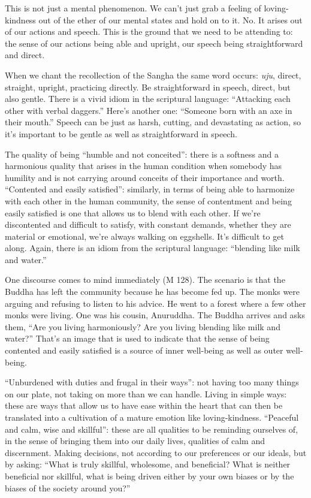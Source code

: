 This is not just a mental phenomenon. We can’t just grab a feeling of
loving-kindness out of the ether of our mental states and hold on to it.
No. It arises out of our actions and speech. This is the ground that we
need to be attending to: the sense of our actions being able and
upright, our speech being straightforward and direct.

When we chant the recollection of the Sangha the same word occurs:
\emph{uju}, direct, straight, upright, practicing directly. Be
straightforward in speech, direct, but also gentle. There is a vivid
idiom in the scriptural language: “Attacking each other with verbal
daggers.” Here’s another one: “Someone born with an axe in their mouth.”
Speech can be just as harsh, cutting, and devastating as action, so it’s
important to be gentle as well as straightforward in speech.

The quality of being “humble and not conceited”: there is a softness and
a harmonious quality that arises in the human condition when somebody
has humility and is not carrying around conceits of their importance and
worth. “Contented and easily satisfied”: similarly, in terms of being
able to harmonize with each other in the human community, the sense of
contentment and being easily satisfied is one that allows us to blend
with each other. If we’re discontented and difficult to satisfy, with
constant demands, whether they are material or emotional, we’re always
walking on eggshells. It’s difficult to get along. Again, there is an
idiom from the scriptural language: “blending like milk and water.”

One discourse comes to mind immediately (M 128). The scenario is that
the Buddha has left the community because he has become fed up. The
monks were arguing and refusing to listen to his advice. He went to a
forest where a few other monks were living. One was his cousin,
Anuruddha. The Buddha arrives and asks them, “Are you living
harmoniously? Are you living blending like milk and water?” That’s an
image that is used to indicate that the sense of being contented and
easily satisfied is a source of inner well-being as well as outer
well-being.

“Unburdened with duties and frugal in their ways”: not having too many
things on our plate, not taking on more than we can handle. Living in
simple ways: these are ways that allow us to have ease within the heart
that can then be translated into a cultivation of a mature emotion like
loving-kindness. “Peaceful and calm, wise and skillful”: these are all
qualities to be reminding ourselves of, in the sense of bringing them
into our daily lives, qualities of calm and discernment. Making
decisions, not according to our preferences or our ideals, but by
asking: “What is truly skillful, wholesome, and beneficial? What is
neither beneficial nor skillful, what is being driven either by your own
biases or by the biases of the society around you?”

